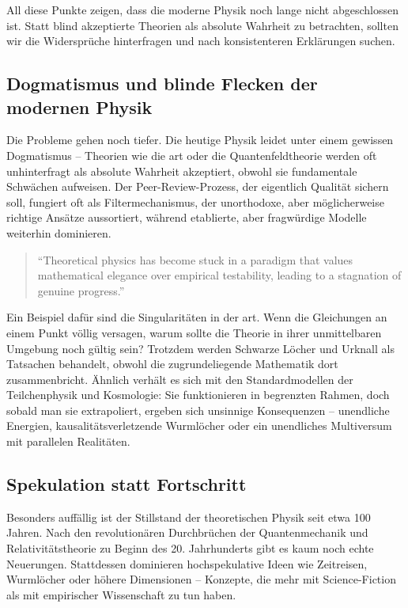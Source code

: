 All diese Punkte zeigen, dass die moderne Physik noch lange nicht abgeschlossen ist. Statt blind akzeptierte Theorien als absolute Wahrheit zu betrachten, sollten wir die
Widersprüche hinterfragen und nach konsistenteren Erklärungen suchen.

\subsection{Dogmatismus und blinde Flecken der modernen Physik}
Die Probleme gehen noch tiefer. Die heutige Physik leidet unter einem gewissen Dogmatismus – Theorien wie die \gls{art} oder die Quantenfeldtheorie werden oft unhinterfragt
als absolute Wahrheit akzeptiert, obwohl sie fundamentale Schwächen aufweisen. Der Peer-Review-Prozess, der eigentlich Qualität sichern soll, fungiert oft als Filtermechanismus,
der unorthodoxe, aber möglicherweise richtige Ansätze aussortiert, während etablierte, aber fragwürdige Modelle weiterhin dominieren.
\begin{quote}
    \enquote{Theoretical physics has become stuck in a paradigm that values mathematical elegance over empirical testability, leading to a stagnation of genuine progress.} \cite{Smolin2006}
\end{quote}
Ein Beispiel dafür sind die Singularitäten in der \gls{art}. Wenn die Gleichungen an einem Punkt völlig versagen, warum sollte die Theorie in ihrer unmittelbaren Umgebung noch gültig sein?
Trotzdem werden Schwarze Löcher und Urknall als Tatsachen behandelt, obwohl die zugrundeliegende Mathematik dort zusammenbricht. Ähnlich verhält es sich mit den Standardmodellen der
Teilchenphysik und Kosmologie: Sie funktionieren in begrenzten Rahmen, doch sobald man sie extrapoliert, ergeben sich unsinnige Konsequenzen – unendliche Energien, kausalitätsverletzende
Wurmlöcher oder ein unendliches Multiversum mit parallelen Realitäten.

\subsection{Spekulation statt Fortschritt}
Besonders auffällig ist der Stillstand der theoretischen Physik seit etwa 100 Jahren. Nach den revolutionären Durchbrüchen der Quantenmechanik und Relativitätstheorie zu Beginn des
20. Jahrhunderts gibt es kaum noch echte Neuerungen. Stattdessen dominieren hochspekulative Ideen wie Zeitreisen, Wurmlöcher oder höhere Dimensionen – Konzepte, die mehr mit
Science-Fiction als mit empirischer Wissenschaft zu tun haben.

